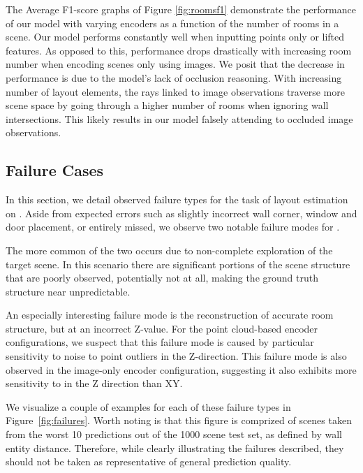 The Average F1-score graphs of Figure \ref{fig:roomsf1} demonstrate
the performance of our \METHOD{} model with varying encoders
as a function of the number of rooms in a scene.
Our \METHOD{} model performs constantly well 
when inputting points only or lifted features.
As opposed to this, 
performance drops drastically with increasing room number
when encoding scenes only using images.
We posit that the decrease in performance is due to
the model's lack of occlusion reasoning.
With increasing number of layout elements,
the rays linked to image observations traverse
more scene space by going
through a higher number of rooms
when ignoring wall intersections.
This likely results in 
our model falsely attending to occluded image observations.


\subsection{Failure Cases}

%
In this section, we detail observed failure types for the task of layout estimation on \DatasetName{}.
Aside from expected errors such as slightly incorrect wall corner, window and door placement, or entirely missed, we observe two notable failure modes for \METHOD.

The more common of the two occurs due to non-complete exploration of the target scene. In this scenario there are significant portions of the scene structure that are poorly observed, potentially not at all, making the ground truth structure near unpredictable.

An especially interesting failure mode is the reconstruction of accurate room structure, but at an incorrect Z-value. For the point cloud-based encoder configurations, we suspect that this failure mode is caused by particular sensitivity to noise to point outliers in the Z-direction. This failure mode is also observed in the image-only encoder configuration, suggesting it also exhibits more sensitivity to in the Z direction than XY.

We visualize a couple of examples for each of these failure types in Figure~\ref{fig:failures}. Worth noting is that this figure is comprized of scenes taken from the worst 10 predictions out of the 1000 scene test set, as defined by wall entity distance. Therefore, while clearly illustrating the failures described, they should not be taken as representative of general prediction quality.



